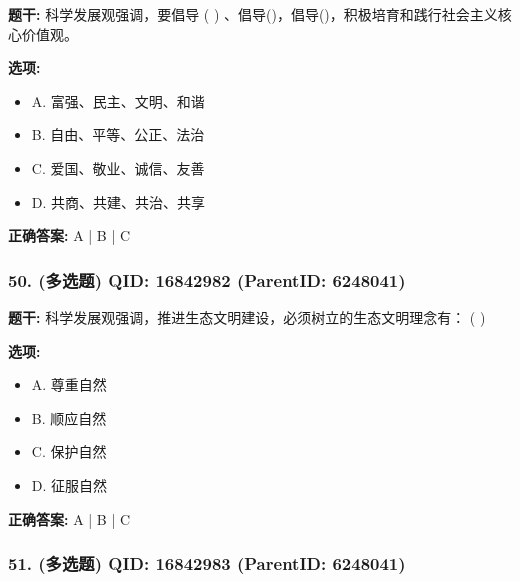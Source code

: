 \documentclass[12pt,UTF8]{ctexart}
\begin{document}
\textbf{题干:}
科学发展观强调，要倡导 ( ) 、倡导()，倡导()，积极培育和践行社会主义核心价值观。



\textbf{选项:}
\begin{itemize}[leftmargin=*]

  \item A. 富强、民主、文明、和谐

  \item B. 自由、平等、公正、法治

  \item C. 爱国、敬业、诚信、友善

  \item D. 共商、共建、共治、共享

\end{itemize}

\textbf{正确答案:}
A | B | C

\vspace{0.3em}\hrulefill\vspace{0.7em}

\subsubsection*{50. (多选题) \small QID: 16842982 (ParentID: 6248041)}

\textbf{题干:}
科学发展观强调，推进生态文明建设，必须树立的生态文明理念有： ( )



\textbf{选项:}
\begin{itemize}[leftmargin=*]

  \item A. 尊重自然

  \item B. 顺应自然

  \item C. 保护自然

  \item D. 征服自然

\end{itemize}

\textbf{正确答案:}
A | B | C

\vspace{0.3em}\hrulefill\vspace{0.7em}

\subsubsection*{51. (多选题) \small QID: 16842983 (ParentID: 6248041)}
\end{document}
